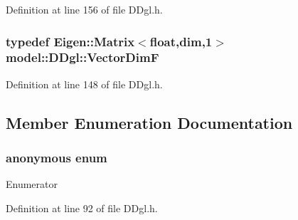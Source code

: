 Definition at line 156 of file D\+Dgl.\+h.

\hypertarget{structmodel_1_1_d_dgl_a62488dd3f15b5fdbc3af48f939d14315}{}
\subsubsection[{Vector\+Dim\+F}]{\setlength{\rightskip}{0pt plus 5cm}typedef Eigen\+::\+Matrix$<$float,{\bf dim},1$>$ {\bf model\+::\+D\+Dgl\+::\+Vector\+Dim\+F}}\label{structmodel_1_1_d_dgl_a62488dd3f15b5fdbc3af48f939d14315}


Definition at line 148 of file D\+Dgl.\+h.



\subsection{Member Enumeration Documentation}
\hypertarget{structmodel_1_1_d_dgl_a1f5dd296ca989518a7c4fbf64f806d83}{}\subsubsection[{anonymous enum}]{\setlength{\rightskip}{0pt plus 5cm}anonymous enum}\label{structmodel_1_1_d_dgl_a1f5dd296ca989518a7c4fbf64f806d83}
\begin{Desc}
\item[Enumerator]\par
\begin{description}
\item[{\em 
\hypertarget{structmodel_1_1_d_dgl_a1f5dd296ca989518a7c4fbf64f806d83ae512fd775be1f111c52fac52708128a1}{}dim\label{structmodel_1_1_d_dgl_a1f5dd296ca989518a7c4fbf64f806d83ae512fd775be1f111c52fac52708128a1}
}]\end{description}
\end{Desc}


Definition at line 92 of file D\+Dgl.\+h.

\hypertarget{structmodel_1_1_d_dgl_a75a4f7f76c2ef6659a294b0fd96e5433}{}
